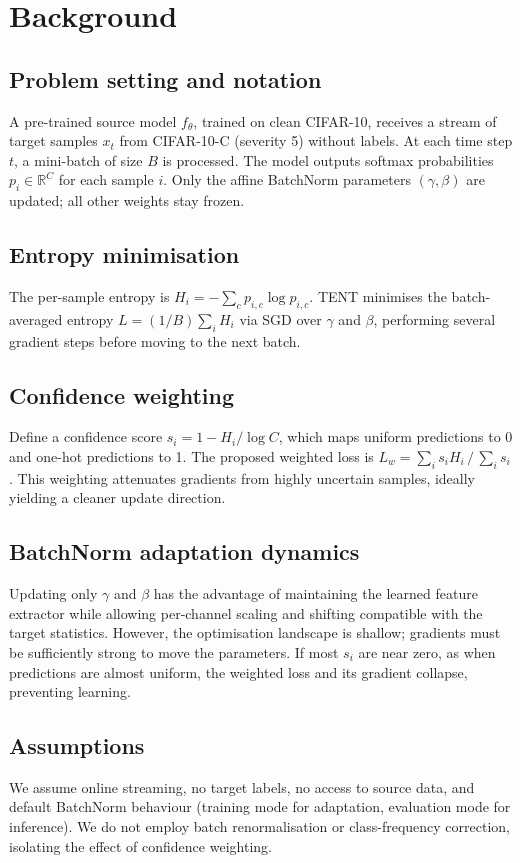 \documentclass{article} %
\begin{document}
\section{Background}
\label{sec:background}
\subsection{Problem setting and notation}
A pre-trained source model \(f_{\theta}\), trained on clean CIFAR-10, receives a stream of target samples \(x_{t}\) from CIFAR-10-C (severity 5) without labels. At each time step \(t\), a mini-batch of size \(B\) is processed. The model outputs softmax probabilities \(p_{i} \in \mathbb{R}^{C}\) for each sample \(i\). Only the affine BatchNorm parameters \((\gamma, \beta)\) are updated; all other weights stay frozen.

\subsection{Entropy minimisation}
The per-sample entropy is \(H_{i} = -\sum_{c} p_{i,c} \log p_{i,c}\). TENT minimises the batch-averaged entropy \(L = (1/B) \sum_{i} H_{i}\) via SGD over \(\gamma\) and \(\beta\), performing several gradient steps before moving to the next batch.

\subsection{Confidence weighting}
Define a confidence score \(s_{i} = 1 - H_{i}/\log C\), which maps uniform predictions to 0 and one-hot predictions to 1. The proposed weighted loss is \(L_{w} = \sum_{i} s_{i} H_{i}\,/\, \sum_{i} s_{i}\). This weighting attenuates gradients from highly uncertain samples, ideally yielding a cleaner update direction.

\subsection{BatchNorm adaptation dynamics}
Updating only \(\gamma\) and \(\beta\) has the advantage of maintaining the learned feature extractor while allowing per-channel scaling and shifting compatible with the target statistics. However, the optimisation landscape is shallow; gradients must be sufficiently strong to move the parameters. If most \(s_{i}\) are near zero, as when predictions are almost uniform, the weighted loss and its gradient collapse, preventing learning.

\subsection{Assumptions}
We assume online streaming, no target labels, no access to source data, and default BatchNorm behaviour (training mode for adaptation, evaluation mode for inference). We do not employ batch renormalisation or class-frequency correction, isolating the effect of confidence weighting.
\end{document}
